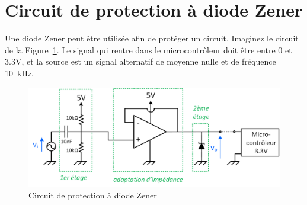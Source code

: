 \documentclass{../template/labo}
\begin{document}
\section{Circuit de protection à diode Zener}

Une diode Zener peut être utilisée afin de protéger un circuit. Imaginez le circuit de la Figure~\ref{fig:circuit_zener}. Le signal qui rentre dans le microcontrôleur doit être entre 0 et 3.3V, et la source est un signal alternatif de moyenne nulle et de fréquence 10~kHz. 
\begin{figure}[h!]
	\begin{center}
		\includegraphics{figures/circuit_zener.png}
	\end{center}
\caption{Circuit de protection à diode Zener}
\label{fig:circuit_zener}
\end{figure}
\end{document}
